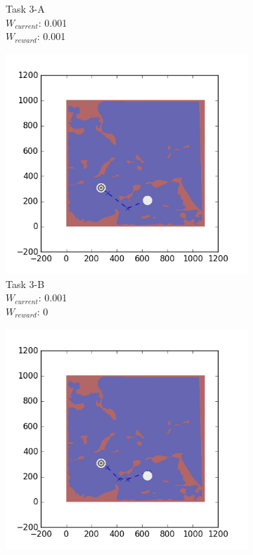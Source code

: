 \documentclass{tamuccthesis}
\begin{document}
\begin{figure}[H]
\begin{subfigure}[b]{0.24\textwidth}
        \caption{{\small Task 3-A \\ $W_{current}$: 0.001 \\ $W_{reward}$: 0.001}}   
        \label{fig:Path_3-A_upCurrent_Reward}
    \end{subfigure}
    \begin{subfigure}[b]{0.24\textwidth}
        \centering
        \includegraphics[width=\textwidth,trim={4cm 3cm 2cm 3cm},clip]{EXP3RG_PathCb_-1_-1_0d001_0.png}
        \caption{{\small Task 3-B \\ $W_{current}$: 0.001 \\ $W_{reward}$: 0}}    
        \label{fig:Path_3-B_upCurrent_noReward}
    \end{subfigure}
    \begin{subfigure}[b]{0.24\textwidth}  
        \centering 
        \includegraphics[width=\textwidth,trim={4cm 3cm 2cm 3cm},clip]{EXP3RG_PathCb_-1_-1_0d001_-1.png}

\end{subfigure}
\end{figure}
\end{document}
